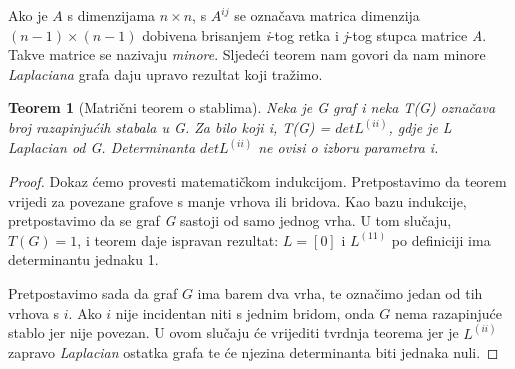 \documentclass[times, utf8, zavrsni]{fer}
\newtheorem{theorem}{Teorem}[chapter]
\begin{document}
Ako je $A$ s dimenzijama $n \times n$, s $A^{ij}$ se označava matrica dimenzija $(n - 1) \times (n - 1)$ dobivena brisanjem \textit{i}-tog retka i \textit{j}-tog stupca matrice \textit{A}. Takve matrice se nazivaju \textit{minore}. Sljedeći teorem nam govori da nam minore \textit{Laplaciana} grafa daju upravo rezultat koji tražimo.\cite{MB}

\begin{theorem}[Matrični teorem o stablima]
Neka je G graf i neka T(G) označava broj razapinjućih stabala u G. Za bilo koji i, T(G) = $det L^{(ii)}$, gdje je L Laplacian od G. Determinanta $det L^{(ii)}$ ne ovisi o izboru parametra i.
\end{theorem}

\begin{proof}
Dokaz ćemo provesti matematičkom indukcijom. Pretpostavimo da teorem vrijedi za povezane grafove s manje vrhova ili bridova. Kao bazu indukcije, pretpostavimo da se graf \textit{G} sastoji od samo jednog vrha. U tom slučaju, $T(G) = 1$, i teorem daje ispravan rezultat: $L = [0]$ i $L^{(11)}$ po definiciji ima determinantu jednaku 1.

Pretpostavimo sada da graf $G$ ima barem dva vrha, te označimo jedan od tih vrhova s $i$. Ako $i$ nije incidentan niti s jednim bridom, onda $G$ nema razapinjuće stablo jer nije povezan. U ovom slučaju će vrijediti tvrdnja teorema jer je $L^{(ii)}$ zapravo \textit{Laplacian} ostatka grafa te će njezina determinanta biti jednaka nuli.


\end{proof}
\end{document}
